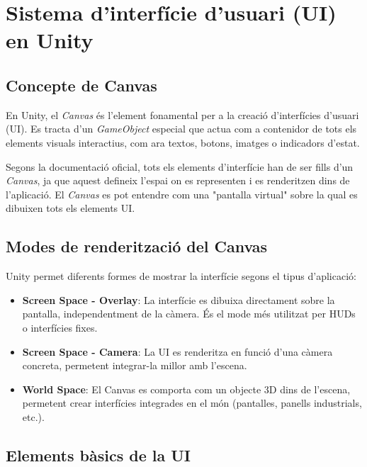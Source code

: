 \documentclass[12pt,a4paper]{report}
\begin{document}
\section{Sistema d'interfície d'usuari (UI) en Unity}

\subsection{Concepte de Canvas}

En Unity, el \textit{Canvas} és l'element fonamental per a la creació d'interfícies d'usuari (UI). Es tracta d'un \textit{GameObject} especial que actua com a contenidor de tots els elements visuals interactius, com ara textos, botons, imatges o indicadors d'estat.

Segons la documentació oficial, tots els elements d'interfície han de ser fills d'un \textit{Canvas}, ja que aquest defineix l'espai on es representen i es renderitzen dins de l'aplicació. \cite{UnityCanvas} El \textit{Canvas} es pot entendre com una "pantalla virtual" sobre la qual es dibuixen tots els elements UI.
%
%
\subsection{Modes de renderització del Canvas}

Unity permet diferents formes de mostrar la interfície segons el tipus d'aplicació:

\begin{itemize}

\item \textbf{Screen Space - Overlay}:  
La interfície es dibuixa directament sobre la pantalla, independentment de la càmera. És el mode més utilitzat per HUDs o interfícies fixes.

\item \textbf{Screen Space - Camera}:  
La UI es renderitza en funció d'una càmera concreta, permetent integrar-la millor amb l'escena.

\item \textbf{World Space}:  
El Canvas es comporta com un objecte 3D dins de l'escena, permetent crear interfícies integrades en el món (pantalles, panells industrials, etc.).

\end{itemize}


\subsection{Elements bàsics de la UI}
\end{document}

